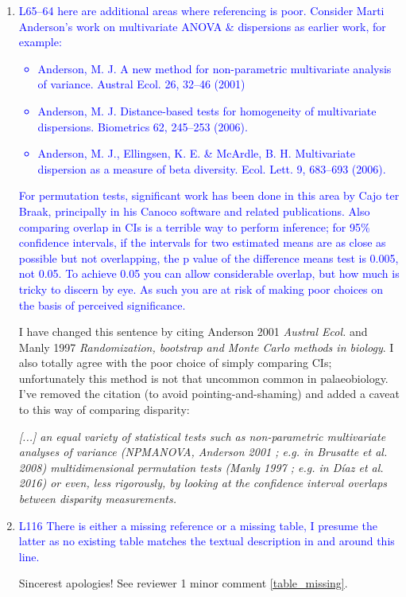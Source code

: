 \documentclass[12pt,letterpaper]{article}
\begin{document}
\begin{enumerate}
\item{\textcolor{blue}{L65--64 here are additional areas where referencing is poor. Consider Marti Anderson's work on multivariate ANOVA \& dispersions as earlier work, for example:
\begin{itemize}
\item Anderson, M. J. A new method for non-parametric multivariate analysis of variance. Austral Ecol. 26, 32–46 (2001)
\item Anderson, M. J. Distance-based tests for homogeneity of multivariate dispersions. Biometrics 62, 245–253 (2006).
\item Anderson, M. J., Ellingsen, K. E. \& McArdle, B. H. Multivariate dispersion as a measure of beta diversity. Ecol. Lett. 9, 683–693 (2006).
\end{itemize}
}}
\textcolor{blue}{For permutation tests, significant work has been done in this area by Cajo ter Braak, principally in his Canoco software and related publications.
Also comparing overlap in CIs is a terrible way to perform inference; for 95\% confidence intervals, if the intervals for two estimated means are as close as possible but not overlapping, the p value of the difference means test is 0.005, not 0.05. To achieve 0.05 you can allow considerable overlap, but how much is tricky to discern by eye.
As such you are at risk of making poor choices on the basis of perceived significance.}

I have changed this sentence by citing Anderson 2001 \textit{Austral Ecol.} and Manly 1997 \textit{Randomization, bootstrap and Monte Carlo methods in biology}.
I also totally agree with the poor choice of simply comparing CIs; unfortunately this method is not that uncommon common in palaeobiology.
I've removed the citation (to avoid pointing-and-shaming) and added a caveat to this way of comparing disparity:

\textit{[...] an equal variety of statistical tests such as non-parametric multivariate analyses of variance (NPMANOVA, Anderson 2001 ; e.g. in Brusatte et al. 2008) multidimensional permutation tests (Manly 1997 ; e.g. in Díaz et al. 2016) or even, less rigorously, by looking at the confidence interval overlaps between disparity measurements.}

\item{\textcolor{blue}{L116 There is either a missing reference or a missing table, I presume the latter as no existing table matches the textual description in and around this line.}}

Sincerest apologies! See reviewer 1 minor comment \ref{table_missing}.


\end{enumerate}
\end{document}
